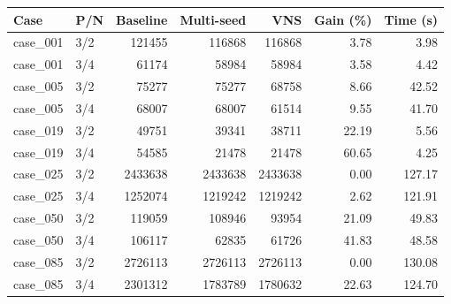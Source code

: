 \begin{tabular}{llrrrrr}
\toprule
Case & P/N & Baseline & Multi-seed & VNS & Gain (\%) & Time (s) \\
\midrule
case\_001 & 3/2 & 121455 & 116868 & 116868 & 3.78 & 3.98 \\
case\_001 & 3/4 & 61174 & 58984 & 58984 & 3.58 & 4.42 \\
case\_005 & 3/2 & 75277 & 75277 & 68758 & 8.66 & 42.52 \\
case\_005 & 3/4 & 68007 & 68007 & 61514 & 9.55 & 41.70 \\
case\_019 & 3/2 & 49751 & 39341 & 38711 & 22.19 & 5.56 \\
case\_019 & 3/4 & 54585 & 21478 & 21478 & 60.65 & 4.25 \\
case\_025 & 3/2 & 2433638 & 2433638 & 2433638 & 0.00 & 127.17 \\
case\_025 & 3/4 & 1252074 & 1219242 & 1219242 & 2.62 & 121.91 \\
case\_050 & 3/2 & 119059 & 108946 & 93954 & 21.09 & 49.83 \\
case\_050 & 3/4 & 106117 & 62835 & 61726 & 41.83 & 48.58 \\
case\_085 & 3/2 & 2726113 & 2726113 & 2726113 & 0.00 & 130.08 \\
case\_085 & 3/4 & 2301312 & 1783789 & 1780632 & 22.63 & 124.70 \\
\bottomrule
\end{tabular}
